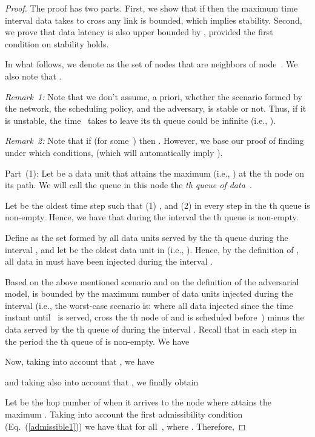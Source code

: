 \documentclass[journal,twocolumn]{./IEEEtran}
\begin{document}
\begin{proof}
The proof has two parts. First, we 
show
that if  then the maximum time interval data takes to cross any link is bounded, which implies stability. Second, we prove that
data latency
is also upper bounded 
by , provided the first condition on stability  holds.

In what follows, we denote as  the set of nodes that are neighbors of node~. We also note that .

\emph{Remark~1:} Note that we don't assume, a priori, whether the scenario formed by the network, the scheduling policy, and the adversary, is stable or not. Thus, if it is unstable, the time~ takes to leave its th queue could be infinite (i.e., ). 


\emph{Remark~2:} Note that if  (for some~) then . However, we base our proof of finding under which conditions,  (which will automatically imply ).

Part~(1):  Let  be a data unit that attains the maximum  (i.e., ) at the th node on its path. We will call the queue in this node the {\em th queue of data~}.

Let  be the oldest time step such that (1) , and (2) in every step in  the th queue is non-empty. Hence, we have that during the interval  the th queue is non-empty.

Define  as the set formed by all data units served by the th queue during the interval , and let  be the oldest data unit in  (i.e., ).  Hence, by the definition of , all data in  must have been injected during the interval . 



Based on the above mentioned scenario and on the definition of the adversarial model,  
is
bounded by the maximum number of data units injected 
during the interval  
(i.e., the worst-case scenario is: where all data injected 
since the
time instant  until~ is served, cross the th node of  and is scheduled 
before~) 
minus the data served by the th queue of  during the interval . 
Recall that in each step in the period  the th queue of  is non-empty.
We have


Now, taking into account that  , we have


and taking also into account that , we finally obtain




Let  be the hop number of  when it arrives to the node where  attains the maximum . Taking into account the first admissibility condition (Eq.~(\ref{admissible1})) we have that   for all~, where . Therefore, 



\end{proof}
\end{document}
